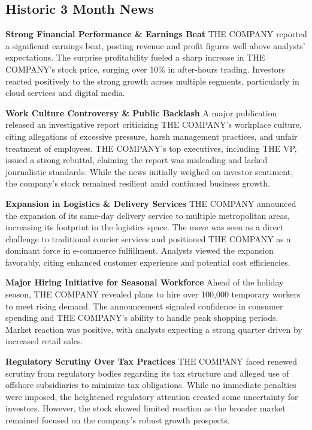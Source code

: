 \documentclass[8pt]{scrartcl}
\begin{document}
\subsection*{Historic 3 Month News}

\textbf{Strong Financial Performance \& Earnings Beat}
THE COMPANY reported a significant earnings beat, posting revenue and profit figures well above analysts’ expectations. The surprise profitability fueled a sharp increase in THE COMPANY’s stock price, surging over 10\% in after-hours trading. Investors reacted positively to the strong growth across multiple segments, particularly in cloud services and digital media.

\textbf{Work Culture Controversy \& Public Backlash}
A major publication released an investigative report criticizing THE COMPANY’s workplace culture, citing allegations of excessive pressure, harsh management practices, and unfair treatment of employees. THE COMPANY’s top executives, including THE VP, issued a strong rebuttal, claiming the report was misleading and lacked journalistic standards. While the news initially weighed on investor sentiment, the company’s stock remained resilient amid continued business growth.

\textbf{Expansion in Logistics \& Delivery Services}
THE COMPANY announced the expansion of its same-day delivery service to multiple metropolitan areas, increasing its footprint in the logistics space. The move was seen as a direct challenge to traditional courier services and positioned THE COMPANY as a dominant force in e-commerce fulfillment. Analysts viewed the expansion favorably, citing enhanced customer experience and potential cost efficiencies.

\textbf{Major Hiring Initiative for Seasonal Workforce}
Ahead of the holiday season, THE COMPANY revealed plans to hire over 100,000 temporary workers to meet rising demand. The announcement signaled confidence in consumer spending and THE COMPANY’s ability to handle peak shopping periods. Market reaction was positive, with analysts expecting a strong quarter driven by increased retail sales.

\textbf{Regulatory Scrutiny Over Tax Practices}
THE COMPANY faced renewed scrutiny from regulatory bodies regarding its tax structure and alleged use of offshore subsidiaries to minimize tax obligations. While no immediate penalties were imposed, the heightened regulatory attention created some uncertainty for investors. However, the stock showed limited reaction as the broader market remained focused on the company's robust growth prospects.
\end{document}
